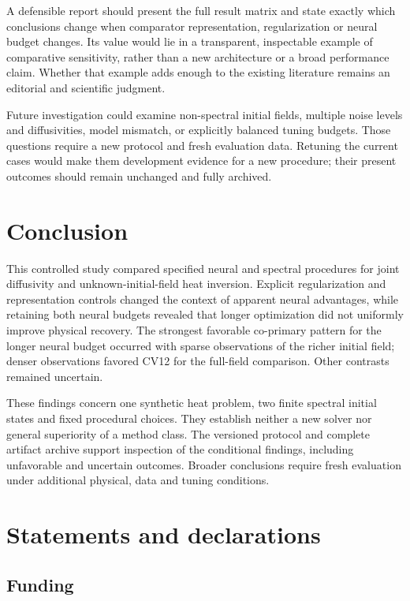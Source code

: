 \documentclass[10pt,a4paper]{article}
\begin{document}
A defensible report should present the full result matrix and state exactly
which conclusions change when comparator representation, regularization or
neural budget changes. Its value would lie in a transparent, inspectable example
of comparative sensitivity, rather than a new architecture or a broad performance
claim. Whether that example adds enough to the existing literature remains an
editorial and scientific judgment.

Future investigation could examine non-spectral initial fields, multiple noise
levels and diffusivities, model mismatch, or explicitly balanced tuning budgets.
Those questions require a new protocol and fresh evaluation data. Retuning the
current cases would make them development evidence for a new procedure; their
present outcomes should remain unchanged and fully archived.

\section{Conclusion}

This controlled study compared specified neural and spectral procedures for
joint diffusivity and unknown-initial-field heat inversion. Explicit
regularization and representation controls changed the context of apparent
neural advantages, while retaining both neural budgets revealed that longer
optimization did not uniformly improve physical recovery. The strongest
favorable co-primary pattern for the longer neural budget occurred with sparse
observations of the richer initial field; denser observations favored CV12 for
the full-field comparison. Other contrasts remained uncertain.

These findings concern one synthetic heat problem, two finite spectral initial
states and fixed procedural choices. They establish neither a new solver nor
general superiority of a method class. The versioned protocol and complete
artifact archive support inspection of the conditional findings, including
unfavorable and uncertain outcomes. Broader conclusions require fresh evaluation
under additional physical, data and tuning conditions.

\section*{Statements and declarations}


\subsection*{Funding}
\end{document}
